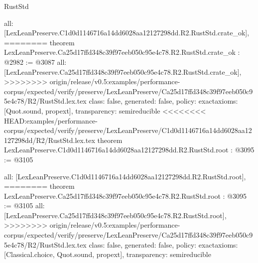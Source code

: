 \begin{lexlean}{RustStd}
\begin{coremodule}
{\begin{coremodule}
{{{{{{  all: [LexLeanPreserve.C1d0d1146716a14dd6028aa12127298dd.R2.RustStd.crate_ok],
========
theorem LexLeanPreserve.Ca25d17ffd348c39f97eeb050c95e4c78.R2.RustStd.crate_ok : @2982 := @3087 {
  all: [LexLeanPreserve.Ca25d17ffd348c39f97eeb050c95e4c78.R2.RustStd.crate_ok],
>>>>>>>> origin/release/v0.5:examples/performance-corpus/expected/verify/preserve/LexLeanPreserve/Ca25d17ffd348c39f97eeb050c95e4c78/R2/RustStd.lex.tex
  class: false,
  generated: false,
  policy: exact{axioms: [Quot.sound, propext]},
  transparency: semireducible
}
<<<<<<<< HEAD:examples/performance-corpus/expected/verify/preserve/LexLeanPreserve/C1d0d1146716a14dd6028aa12127298dd/R2/RustStd.lex.tex
theorem LexLeanPreserve.C1d0d1146716a14dd6028aa12127298dd.R2.RustStd.root : @3095 := @3105 {
  all: [LexLeanPreserve.C1d0d1146716a14dd6028aa12127298dd.R2.RustStd.root],
========
theorem LexLeanPreserve.Ca25d17ffd348c39f97eeb050c95e4c78.R2.RustStd.root : @3095 := @3105 {
  all: [LexLeanPreserve.Ca25d17ffd348c39f97eeb050c95e4c78.R2.RustStd.root],
>>>>>>>> origin/release/v0.5:examples/performance-corpus/expected/verify/preserve/LexLeanPreserve/Ca25d17ffd348c39f97eeb050c95e4c78/R2/RustStd.lex.tex
  class: false,
  generated: false,
  policy: exact{axioms: [Classical.choice, Quot.sound, propext]},
  transparency: semireducible
}

}}}}}}}
\end{coremodule}}
\end{coremodule}
\end{lexlean}
